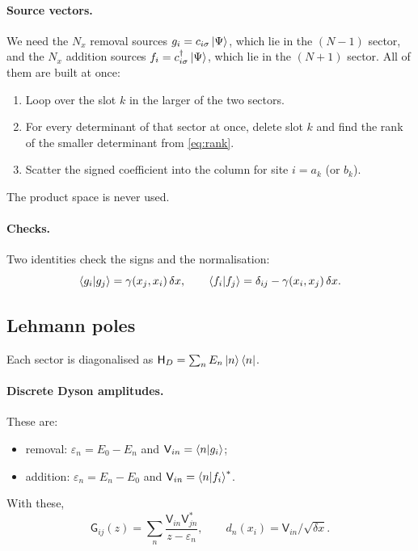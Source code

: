 \documentclass[11pt,a4paper]{article}
\newcommand{\dx}{\delta x}
\newcommand{\mat}[1]{\mathsf{#1}}
\newcommand{\Nx}{N_x}
\begin{document}
\paragraph{Source vectors.} We need the $\Nx$ removal sources $g_i = c_{i\sigma}\ket{\Psi}$, which lie in the $(N-1)$ sector, and the $\Nx$ addition sources $f_i = c^\dagger_{i\sigma}\ket{\Psi}$, which lie in the $(N+1)$ sector. All of them are built at once:
\begin{enumerate}
\item Loop over the slot $k$ in the larger of the two sectors.
\item For every determinant of that sector at once, delete slot $k$ and find the rank of the smaller determinant from \cref{eq:rank}.
\item Scatter the signed coefficient into the column for site $i = a_k$ (or $b_k$).
\end{enumerate}
The product space is never used.

\paragraph{Checks.} Two identities check the signs and the normalisation:
\begin{equation}
\braket{g_i|g_j} = \gamma(x_j,x_i)\,\dx, \qquad \braket{f_i|f_j} = \delta_{ij} - \gamma(x_i,x_j)\,\dx.
\label{eq:source-identities}
\end{equation}

\subsection{Lehmann poles}

Each sector is diagonalised as $\mat H_D = \sum_n E_n\ket{n}\bra{n}$.

\paragraph{Discrete Dyson amplitudes.} These are:
\begin{itemize}
\item removal: $\varepsilon_n = E_0 - E_n$ and $\mat V_{in} = \braket{n|g_i}$;
\item addition: $\varepsilon_n = E_n - E_0$ and $\mat V_{in} = \braket{n|f_i}^*$.
\end{itemize}
With these,
\begin{equation}
\mat G_{ij}(z) = \sum_n\frac{\mat V_{in}\mat V_{jn}^*}{z-\varepsilon_n}, \qquad d_n(x_i) = \mat V_{in}/\sqrt{\dx}.
\end{equation}
\end{document}
